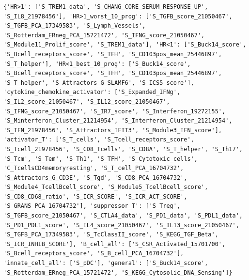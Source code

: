 \documentclass[
  letterpaper,
  DIV=11,
  numbers=noendperiod]{scrartcl}
\begin{document}
\begin{verbatim}
{'HR>1': ['S_TREM1_data', 'S_CHANG_CORE_SERUM_RESPONSE_UP', 'S_IL8_21978456'], 'HR>1_worst_10_prog': ['S_TGFB_score_21050467', 'S_TGFB_PCA_17349583', 'S_Lymph_Vessels', 'S_Rotterdam_ERneg_PCA_15721472', 'S_IFNG_score_21050467', 'S_Module11_Prolif_score', 'S_TREM1_data'], 'HR<1': ['S_Buck14_score', 'S_Bcell_receptors_score', 'S_TFH', 'S_CD103pos_mean_25446897', 'S_T_helper'], 'HR<1_best_10_prog': ['S_Buck14_score', 'S_Bcell_receptors_score', 'S_TFH', 'S_CD103pos_mean_25446897', 'S_T_helper', 'S_Attractors_G_SLAMF6', 'S_ICS5_score'], 'cytokine_chemokine_activator': ['S_Expanded_IFNg', 'S_IL2_score_21050467', 'S_IL12_score_21050467', 'S_IFNG_score_21050467', 'S_IR7_score', 'S_Interferon_19272155', 'S_Minterferon_Cluster_21214954', 'S_Interferon_Cluster_21214954', 'S_IFN_21978456', 'S_Attractors_IFIT3', 'S_Module3_IFN_score'], 'activator_T': ['S_T_cells', 'S_Tcell_receptors_score', 'S_Tcell_21978456', 'S_CD8_Tcells', 'S_CD8A', 'S_T_helper', 'S_Th17', 'S_Tcm', 'S_Tem', 'S_Th1', 'S_TFH', 'S_Cytotoxic_cells', 'C_TcellsCD4memoryresting', 'S_T_cell_PCA_16704732', 'S_Attractors_G_CD3E', 'S_Tgd', 'S_CD8_PCA_16704732', 'S_Module4_TcellBcell_score', 'S_Module5_TcellBcell_score', 'S_CD8_CD68_ratio', 'S_ICR_SCORE', 'S_ICR_ACT_SCORE', 'S_GRANS_PCA_16704732'], 'suppressor_T': ['S_Treg', 'S_TGFB_score_21050467', 'S_CTLA4_data', 'S_PD1_data', 'S_PDL1_data', 'S_PD1_PDL1_score', 'S_IL4_score_21050467', 'S_IL13_score_21050467', 'S_TGFB_PCA_17349583', 'S_TcClassII_score', 'S_KEGG_TGF_Beta', 'S_ICR_INHIB_SCORE'], 'B_cell_all': ['S_CSR_Activated_15701700', 'S_Bcell_receptors_score', 'S_B_cell_PCA_16704732'], 'innate_cell_all': ['S_pDC'], 'general': ['S_Buck14_score', 'S_Rotterdam_ERneg_PCA_15721472', 'S_KEGG_Cytosolic_DNA_Sensing']}
\end{verbatim}
\end{document}
